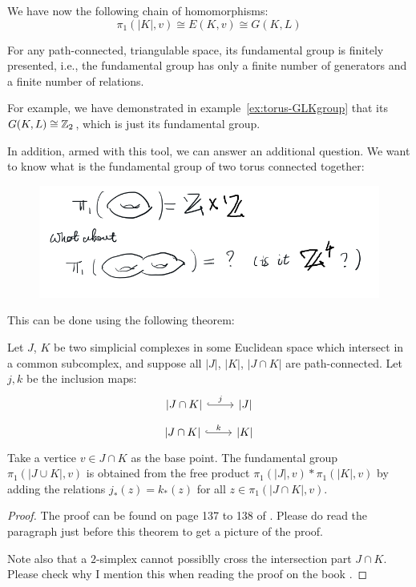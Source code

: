 \begin{remark}
    We have now the following chain of homomorphisms:
    $$ \pi_1(|K|,v)\cong E(K,v) \cong G(K,L) $$
\end{remark}
\begin{coro}
    For any path-connected, triangulable space, its fundamental group
    is finitely presented, i.e., the fundamental group has only a
    finite number of generators and a finite number of relations.
\end{coro}

For example, we have demonstrated in example~\ref{ex:torus-GLKgroup}
that its $G(K,L)\cong \mathbb{Z}_2$, which is just its fundamental group.

In addition, armed with this tool, we can answer an additional
question. We want to know what is the fundamental group of two torus
connected together:

\begin{figure}[H]
    \centering
    \includegraphics[width=0.9\linewidth]{pics/ch6-notes-3/pic-two-torus.png}
\end{figure}

This can be done using the following theorem:

\begin{thm}
    Let $J$, $K$ be two simplicial complexes in some Euclidean space
    which intersect in a common subcomplex, and suppose all $|J|$,
    $|K|$, $|J\cap K|$ are path-connected. Let $j,k$ be the inclusion
    maps:
    $$ \begin{tikzcd}[]
        \lvert J\cap K\rvert \ar[r,"j",hook] & \lvert J\rvert
    \end{tikzcd}$$
    $$ \begin{tikzcd}[]
        \lvert J\cap K\rvert \ar[r,"k",hook] & \lvert K\rvert
    \end{tikzcd}$$
    Take a vertice $v\in J\cap K$ as the base point. The fundamental
    group $\pi_1(|J\cup K|, v)$ is obtained from the free product
    $\pi_1(|J|,v)*\pi_1(|K|,v)$ by adding the relations
    $j_*(z)=k_*(z)$ for all $z\in\pi_1(|J\cap K|,v)$.
\end{thm}
\begin{proof}
    The proof can be found on page 137 to 138 of \cite{book}. Please
    do read the paragraph just before this theorem to get a picture of
    the proof.

    Note also that a $2$-simplex cannot possiblly cross the
    intersection part $J\cap K$. Please check why I mention this when
    reading the proof on the book \cite{book}.
\end{proof}

